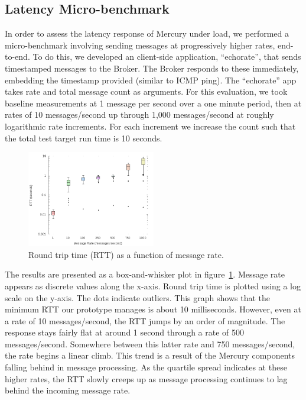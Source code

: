 \subsection{Latency Micro-benchmark}

In order to assess the latency response of Mercury under load, we
performed a micro-benchmark involving sending messages at
progressively higher rates, end-to-end. To do this, we developed an
client-side application, ``echorate'', that sends timestamped messages
to the Broker. The Broker responds to these immediately, embedding the
timestamp provided (similar to ICMP ping). The ``echorate'' app takes
rate and total message count as arguments. For this evaluation, we
took baseline measurements at 1 message per second over a one minute
period, then at rates of 10 messages/second up through 1,000
messages/second at roughly logarithmic rate increments. For each increment
we increase the count such that the total test target run time is
10 seconds.

\begin{figure}[ht]
  \begin{center}
    \includegraphics[width=0.5\textwidth]{figs/RTT.png}
    \caption{Round trip time (RTT) as a function of message rate.}
    \label{fig:RTT}
  \end{center}
\end{figure}

The results are presented as a box-and-whisker plot in
figure~\ref{fig:RTT}. Message rate appears as discrete values along
the x-axis. Round trip time is plotted using a log scale on the
y-axis. The dots indicate outliers. This graph shows that the minimum
RTT our prototype manages is about 10 milliseconds. However, even at a
rate of 10 messages/second, the RTT jumps by an order of
magnitude. The response stays fairly flat at around 1 second through a
rate of 500 messages/second. Somewhere between this latter rate and
750 messages/second, the rate begins a linear climb.  This trend is a
result of the Mercury components falling behind in message processing.
As the quartile spread indicates at these higher rates, the RTT slowly
creeps up as message processing continues to lag behind the incoming
message rate.

